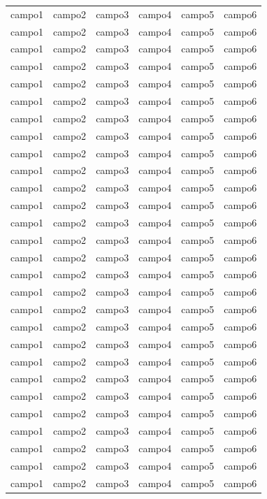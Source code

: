 \begin{longtable}[c]{c|c|c|c|c|c}
	campo1 & campo2 & campo3 & campo4 & campo5 & campo6 \\
	campo1 & campo2 & campo3 & campo4 & campo5 & campo6 \\
	campo1 & campo2 & campo3 & campo4 & campo5 & campo6 \\
	campo1 & campo2 & campo3 & campo4 & campo5 & campo6 \\
	campo1 & campo2 & campo3 & campo4 & campo5 & campo6 \\
	campo1 & campo2 & campo3 & campo4 & campo5 & campo6 \\
	campo1 & campo2 & campo3 & campo4 & campo5 & campo6 \\
	campo1 & campo2 & campo3 & campo4 & campo5 & campo6 \\
	campo1 & campo2 & campo3 & campo4 & campo5 & campo6 \\
	campo1 & campo2 & campo3 & campo4 & campo5 & campo6 \\
	campo1 & campo2 & campo3 & campo4 & campo5 & campo6 \\
	campo1 & campo2 & campo3 & campo4 & campo5 & campo6 \\
	campo1 & campo2 & campo3 & campo4 & campo5 & campo6 \\
	campo1 & campo2 & campo3 & campo4 & campo5 & campo6 \\
	campo1 & campo2 & campo3 & campo4 & campo5 & campo6 \\
	campo1 & campo2 & campo3 & campo4 & campo5 & campo6 \\
	campo1 & campo2 & campo3 & campo4 & campo5 & campo6 \\
	campo1 & campo2 & campo3 & campo4 & campo5 & campo6 \\
	campo1 & campo2 & campo3 & campo4 & campo5 & campo6 \\
	campo1 & campo2 & campo3 & campo4 & campo5 & campo6 \\
	campo1 & campo2 & campo3 & campo4 & campo5 & campo6 \\
	campo1 & campo2 & campo3 & campo4 & campo5 & campo6 \\
	campo1 & campo2 & campo3 & campo4 & campo5 & campo6 \\
	campo1 & campo2 & campo3 & campo4 & campo5 & campo6 \\
	campo1 & campo2 & campo3 & campo4 & campo5 & campo6 \\
	campo1 & campo2 & campo3 & campo4 & campo5 & campo6 \\
	campo1 & campo2 & campo3 & campo4 & campo5 & campo6 \\
	campo1 & campo2 & campo3 & campo4 & campo5 & campo6 \\

\end{longtable}
